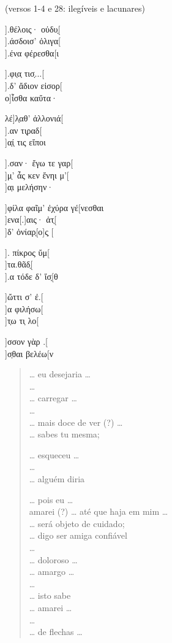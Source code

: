 \begin{gkverse}
\textnormal{(versos 1-4 e 28: ilegíveis e lacunares)}

].θέλοις· οὐδυ̣[\\
].άσδοισ’ ὀλιγα[\\
].ένα φέρεσθα[ι

  ].φι̣α̣ τισ̣...[\\
  ].δ’ ἄδιον εἰσορ[\\
ο]ἶσθα καὔτα·

λέ]λ̣αθ’ ἀλλονιά[\\
     ].αν τι̣ραδ[\\
     ]α̣ί̣ τις εἴποι

].σαν· ἔγω τε γαρ[\\
]μ̣’ ἆς κεν ἔνηι μ’[\\
  ]α̣ι μελήσην·

]φίλα φαῖμ’ ἐχύρα γέ[νεσθαι\\
   ]ενα[.]αις· ἀτ̣[\\
          ]δ’ ὀνίαρ̣[ο]ς̣ [

        ]. πίκρος ὔμ[\\
        ]τα.θᾶδ̣[\\
        ].α τόδε δ’ ἴσ̣[θ

       ]ὤττι σ’ ἐ.[\\
]α φιλήσω[\\
]τ̣ω τι̣ λο[

]σσον γὰρ .[\\
          ]σ̣θαι βελέω[ν
\end{gkverse}

\pagebreak
\begin{verse}
\ldots{} eu desejaria \ldots{}\\
\ldots{}\\
\ldots{} carregar \ldots{}\\
\ldots{}\\
\ldots{} mais doce de ver (?) \ldots{}\\
\ldots{} sabes tu mesma;

\ldots{} esqueceu \ldots{}\\ 
\ldots{}\\
\ldots{} alguém diria

\ldots{} pois eu \ldots{}\\
amarei (?) \ldots{} até que haja em mim \ldots{}\\
\ldots{} será objeto de cuidado;\\
\ldots{} digo ser amiga confiável \\
\ldots{}\\
\ldots{} doloroso \ldots{}\\
\ldots{} amargo \ldots{}\\
\ldots{}\\
\ldots{} isto sabe\\
\ldots{} amarei \ldots{}\\
\ldots{}\\
\ldots{} de flechas \ldots{}
\end{verse}

